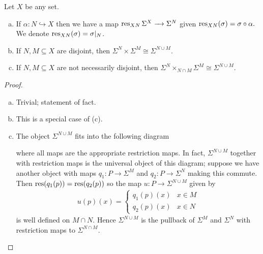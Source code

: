 \documentclass{article}
\begin{document}
\begin{prop}Let $X$ be any set.
  \begin{enumerate}[(a)]
    \item If $\alpha:N \hookrightarrow X$ then we have a map $\res_{XN}\Sigma^X \to \Sigma^N$ given $\operatorname{res}_{XN}(\sigma) = \sigma \circ \alpha.$ We denote $\operatorname{res}_{XN}(\sigma) = \sigma|_N$.
  \item If $N, M \subseteq X$ are disjoint, then $\Sigma^N \times \Sigma^M \cong \Sigma^{N \cup M}$. 
  \item If $N, M \subseteq X$ are not necessarily disjoint, then $\Sigma^N \times_{N\cap M} \Sigma^M \cong \Sigma^{N\cup M}$.
  \end{enumerate}
\end{prop}
\begin{proof}$ $
  \begin{enumerate}[(a)]
    \item Trivial; statement of fact.
    \item This is a special case of (c).
    \item The object $\Sigma^{N\cup M}$ fits into the following diagram
      \begin{center}
      \end{center}
      where all maps are the appropriate restriction maps. In fact, $\Sigma^{N\cup M}$ together with restriction maps is the universal object of this diagram; suppose we have another object with maps $q_1:P \to \Sigma^M$ and $q_2:P\to \Sigma^N$ making this commute. Then $\operatorname{res}(q_1(p)) = \operatorname{res}(q_2(p))$ so the map $u: P\to \Sigma^{N\cup M}$ given by
      \begin{align*}
        u(p)(x) =
        \begin{cases}
          q_1(p)(x) & x \in M \\
          q_2(p)(x) & x \in N
        \end{cases}
      \end{align*}
      is well defined on $M\cap N$. Hence $\Sigma^{N\cup M}$ is the pullback of $\Sigma^M$ and $\Sigma^N$ with restriction maps to $\Sigma^{N\cap M}$.
  \end{enumerate}
\end{proof}
\end{document}
